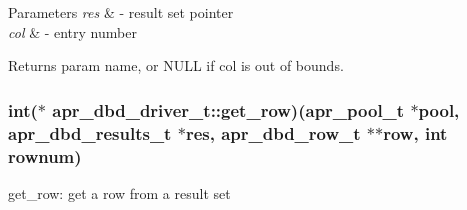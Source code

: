 \begin{DoxyParams}{Parameters}
{\em res} & -\/ result set pointer \\
\hline
{\em col} & -\/ entry number \\
\hline
\end{DoxyParams}
\begin{DoxyReturn}{Returns}
param name, or N\-U\-L\-L if col is out of bounds. 
\end{DoxyReturn}
\hypertarget{structapr__dbd__driver__t_a93b4e127622c1f118da3855c518941cc}{
\subsubsection[{get\-\_\-row}]{\setlength{\rightskip}{0pt plus 5cm}int($\ast$ apr\-\_\-dbd\-\_\-driver\-\_\-t\-::get\-\_\-row)(apr\-\_\-pool\-\_\-t $\ast$pool, apr\-\_\-dbd\-\_\-results\-\_\-t $\ast$res, apr\-\_\-dbd\-\_\-row\-\_\-t $\ast$$\ast$row, int rownum)}}\label{structapr__dbd__driver__t_a93b4e127622c1f118da3855c518941cc}
get\-\_\-row\-: get a row from a result set


